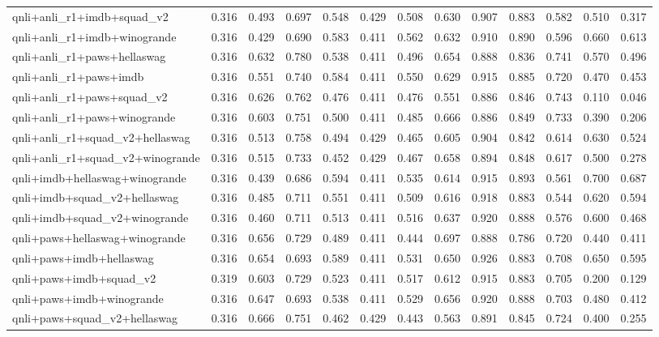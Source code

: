 \begin{table}[t]
\begin{tabular}{lrrrrrrrrrrrr}
    qnli+anli\_r1+imdb+squad\_v2 & 0.316 & 0.493 & 0.697 & 0.548 & 0.429 & 0.508 & 0.630 & 0.907 & 0.883 & 0.582 & 0.510 & 0.317 \\
    qnli+anli\_r1+imdb+winogrande & 0.316 & 0.429 & 0.690 & 0.583 & 0.411 & 0.562 & 0.632 & 0.910 & 0.890 & 0.596 & 0.660 & 0.613 \\
    qnli+anli\_r1+paws+hellaswag & 0.316 & 0.632 & 0.780 & 0.538 & 0.411 & 0.496 & 0.654 & 0.888 & 0.836 & 0.741 & 0.570 & 0.496 \\
    qnli+anli\_r1+paws+imdb & 0.316 & 0.551 & 0.740 & 0.584 & 0.411 & 0.550 & 0.629 & 0.915 & 0.885 & 0.720 & 0.470 & 0.453 \\
    qnli+anli\_r1+paws+squad\_v2 & 0.316 & 0.626 & 0.762 & 0.476 & 0.411 & 0.476 & 0.551 & 0.886 & 0.846 & 0.743 & 0.110 & 0.046 \\
    qnli+anli\_r1+paws+winogrande & 0.316 & 0.603 & 0.751 & 0.500 & 0.411 & 0.485 & 0.666 & 0.886 & 0.849 & 0.733 & 0.390 & 0.206 \\
    qnli+anli\_r1+squad\_v2+hellaswag & 0.316 & 0.513 & 0.758 & 0.494 & 0.429 & 0.465 & 0.605 & 0.904 & 0.842 & 0.614 & 0.630 & 0.524 \\
    qnli+anli\_r1+squad\_v2+winogrande & 0.316 & 0.515 & 0.733 & 0.452 & 0.429 & 0.467 & 0.658 & 0.894 & 0.848 & 0.617 & 0.500 & 0.278 \\
    qnli+imdb+hellaswag+winogrande & 0.316 & 0.439 & 0.686 & 0.594 & 0.411 & 0.535 & 0.614 & 0.915 & 0.893 & 0.561 & 0.700 & 0.687 \\
    qnli+imdb+squad\_v2+hellaswag & 0.316 & 0.485 & 0.711 & 0.551 & 0.411 & 0.509 & 0.616 & 0.918 & 0.883 & 0.544 & 0.620 & 0.594 \\
    qnli+imdb+squad\_v2+winogrande & 0.316 & 0.460 & 0.711 & 0.513 & 0.411 & 0.516 & 0.637 & 0.920 & 0.888 & 0.576 & 0.600 & 0.468 \\
    qnli+paws+hellaswag+winogrande & 0.316 & 0.656 & 0.729 & 0.489 & 0.411 & 0.444 & 0.697 & 0.888 & 0.786 & 0.720 & 0.440 & 0.411 \\
    qnli+paws+imdb+hellaswag & 0.316 & 0.654 & 0.693 & 0.589 & 0.411 & 0.531 & 0.650 & 0.926 & 0.883 & 0.708 & 0.650 & 0.595 \\
    qnli+paws+imdb+squad\_v2 & 0.319 & 0.603 & 0.729 & 0.523 & 0.411 & 0.517 & 0.612 & 0.915 & 0.883 & 0.705 & 0.200 & 0.129 \\
    qnli+paws+imdb+winogrande & 0.316 & 0.647 & 0.693 & 0.538 & 0.411 & 0.529 & 0.656 & 0.920 & 0.888 & 0.703 & 0.480 & 0.412 \\
    qnli+paws+squad\_v2+hellaswag & 0.316 & 0.666 & 0.751 & 0.462 & 0.429 & 0.443 & 0.563 & 0.891 & 0.845 & 0.724 & 0.400 & 0.255 \\

\end{tabular}
\end{table}
